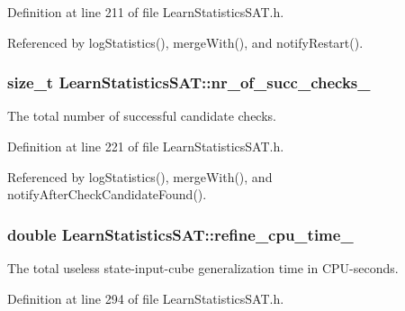 Definition at line 211 of file Learn\-Statistics\-S\-A\-T.\-h.



Referenced by log\-Statistics(), merge\-With(), and notify\-Restart().

\hypertarget{classLearnStatisticsSAT_aa059a13f6afcf98a04be072aa5ce3f1d}{
\subsubsection[{nr\-\_\-of\-\_\-succ\-\_\-checks\-\_\-}]{\setlength{\rightskip}{0pt plus 5cm}size\-\_\-t Learn\-Statistics\-S\-A\-T\-::nr\-\_\-of\-\_\-succ\-\_\-checks\-\_\-\hspace{0.3cm}{\ttfamily [protected]}}}\label{classLearnStatisticsSAT_aa059a13f6afcf98a04be072aa5ce3f1d}


The total number of successful candidate checks. 



Definition at line 221 of file Learn\-Statistics\-S\-A\-T.\-h.



Referenced by log\-Statistics(), merge\-With(), and notify\-After\-Check\-Candidate\-Found().

\hypertarget{classLearnStatisticsSAT_ad50f0623e605d349f3221f9e1332805d}{
\subsubsection[{refine\-\_\-cpu\-\_\-time\-\_\-}]{\setlength{\rightskip}{0pt plus 5cm}double Learn\-Statistics\-S\-A\-T\-::refine\-\_\-cpu\-\_\-time\-\_\-\hspace{0.3cm}{\ttfamily [protected]}}}\label{classLearnStatisticsSAT_ad50f0623e605d349f3221f9e1332805d}


The total useless state-\/input-\/cube generalization time in C\-P\-U-\/seconds. 



Definition at line 294 of file Learn\-Statistics\-S\-A\-T.\-h.



